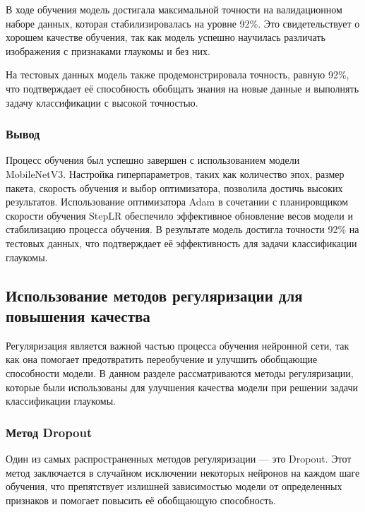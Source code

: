 {    В ходе обучения модель достигала максимальной точности на валидационном наборе данных, которая стабилизировалась на уровне 92\%. Это свидетельствует о хорошем качестве обучения, так как модель успешно научилась различать изображения с признаками глаукомы и без них.

    На тестовых данных модель также продемонстрировала точность, равную 92\%, что подтверждает её способность обобщать знания на новые данные и выполнять задачу классификации с высокой точностью.

    \subsubsection*{Вывод}

    Процесс обучения был успешно завершен с использованием модели MobileNetV3. Настройка гиперпараметров, таких как количество эпох, размер пакета, скорость обучения и выбор оптимизатора, позволила достичь высоких результатов. Использование оптимизатора Adam в сочетании с планировщиком скорости обучения StepLR обеспечило эффективное обновление весов модели и стабилизацию процесса обучения. В результате модель достигла точности 92\% на тестовых данных, что подтверждает её эффективность для задачи классификации глаукомы.

    \vspace{13pt}
    \subsection{Использование методов регуляризации для повышения качества}

    Регуляризация является важной частью процесса обучения нейронной сети, так как она помогает предотвратить переобучение и улучшить обобщающие способности модели. В данном разделе рассматриваются методы регуляризации, которые были использованы для улучшения качества модели при решении задачи классификации глаукомы.

    \subsubsection*{Метод Dropout}

    Один из самых распространенных методов регуляризации — это Dropout. Этот метод заключается в случайном исключении некоторых нейронов на каждом шаге обучения, что препятствует излишней зависимостью модели от определенных признаков и помогает повысить её обобщающую способность.

}
